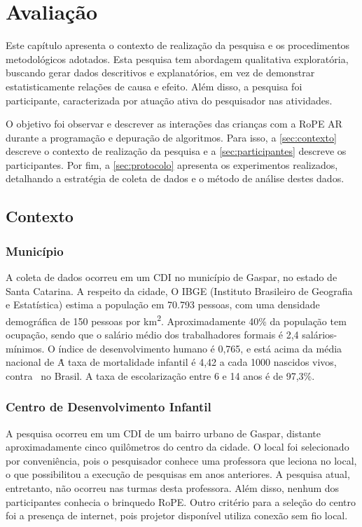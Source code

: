 \chapter{Avaliação}
\label{c_avaliacao}
Este capítulo apresenta o contexto de realização da pesquisa e os procedimentos metodológicos adotados. Esta pesquisa tem abordagem qualitativa exploratória, buscando gerar dados descritivos e explanatórios, em vez de demonstrar estatisticamente relações de causa e efeito. Além disso, a pesquisa foi participante, caracterizada por atuação ativa do pesquisador nas atividades. 

O objetivo foi observar e descrever as interações das crianças com a RoPE AR durante a programação e depuração de algoritmos. Para isso, a \autoref{sec:contexto} descreve o contexto de realização da pesquisa e a \autoref{sec:participantes} descreve os participantes. Por fim, a \autoref{sec:protocolo} apresenta os experimentos realizados, detalhando a estratégia de coleta de dados e o método de análise destes dados.

\section{Contexto}
\label{sec:contexto}
\subsection{Município}
A coleta de dados ocorreu em um \ac{CDI} no município de Gaspar, no estado de Santa Catarina. A respeito da cidade, O IBGE (Instituto Brasileiro de Geografia e Estatística) estima a população em 70.793 pessoas, com uma densidade demográfica de 150 pessoas por km\textsuperscript{2}. Aproximadamente 40\% da população tem ocupação, sendo que o salário médio dos trabalhadores formais é 2,4 salários-mínimos. O índice de desenvolvimento humano é 0,765, e está acima da média nacional de \. A taxa de mortalidade infantil é 4,42 a cada 1000 nascidos vivos, contra \ no Brasil. A taxa de escolarização entre 6 e 14 anos é de 97,3\%.
\subsection{Centro de Desenvolvimento Infantil}
\label{sec:cdi}
A pesquisa ocorreu em um  \ac{CDI} de um bairro urbano de Gaspar, distante aproximadamente cinco quilômetros do centro da cidade. O local foi selecionado por conveniência, pois o pesquisador conhece uma professora que leciona no local, o que possibilitou a execução de pesquisas em anos anteriores. A pesquisa atual, entretanto, não ocorreu nas turmas desta professora. Além disso, nenhum dos participantes conhecia o brinquedo RoPE. Outro critério para a seleção do centro foi a presença de internet, pois projetor disponível utiliza conexão sem fio local.

